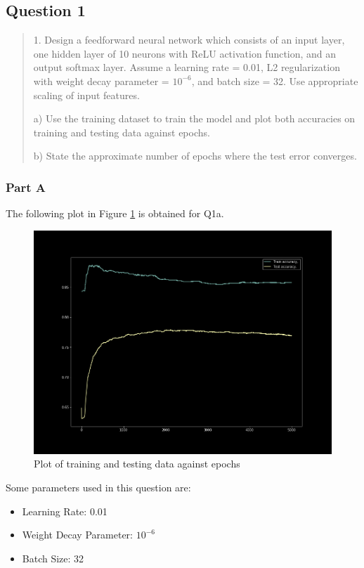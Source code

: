 \subsection{Question 1}
\label{1q1}
\begin{quote}
1. Design a feedforward neural network which consists of an input layer, one hidden layer of 10 neurons with ReLU activation function, and an output softmax layer. Assume a learning rate = 0.01, L2 regularization with weight decay parameter = $10^{-6}$, and batch size = 32. Use appropriate scaling of input features.

a) Use the training dataset to train the model and plot both accuracies on training and
testing data against epochs.

b) State the approximate number of epochs where the test error converges.
\end{quote}

\subsubsection{Part A}
The following plot in Figure \ref{fig:1a} is obtained for Q1a.
\begin{figure}[H]
    \centering
    \includegraphics[width=0.8\linewidth]{assets/plots/part1_Q1a.png}
    \caption{Plot of training and testing data against epochs}
    \label{fig:1a}
\end{figure}

Some parameters used in this question are:
\begin{itemize}
    \item Learning Rate: 0.01
    \item Weight Decay Parameter: $10^{-6}$
    \item Batch Size: 32
\end{itemize}

